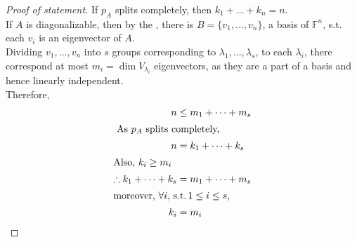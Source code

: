 \documentclass[fleqn, a4paper, 12pt]{article}
\theoremstyle{definition}
\theoremstyle{theorem}
\theoremstyle{remark}
\newcommand{\suchthat}{\mathrm{\,s.t.\,}}
\numberwithin{corollary}{theorem}
\numberwithin{equation}{theorem}
\begin{document}
\begin{proof}[Proof of statement]
	If $p_A$ splits completely, then $k_1 + \dots + k_n = n$.\\
	If $A$ is diagonalizable, then by the , there is $B = \{v_1, \dots, v_n\}$, a basis of $\mathbb{F}^n$, s.t. each $v_i$ is an eigenvector of $A$.\\
	Dividing $v_1, \dots ,v_n$ into $s$ groups corresponding to $\lambda_1, \dots, \lambda_s$, to each $\lambda_i$, there correspond at most $m_i = \dim V_{\lambda_i}$ eigenvectors, as they are a part of a basis and hence linearly independent.\\
	Therefore,
	\begin{align*}
		n &\leq m_1 + \dots + m_s\\
		\intertext{	As $p_A$ splits completely,}
		n &= k_1 + \dots + k_s\\
		\intertext{Also, $k_i \geq m_i$}
		\therefore k_1 + \dots + k_s &= m_1 + \dots + m_s\\
		\intertext{moreover, $\forall i, \suchthat 1 \leq i \leq s$,}
		k_i &= m_i
	\end{align*}
\end{proof}
\end{document}
